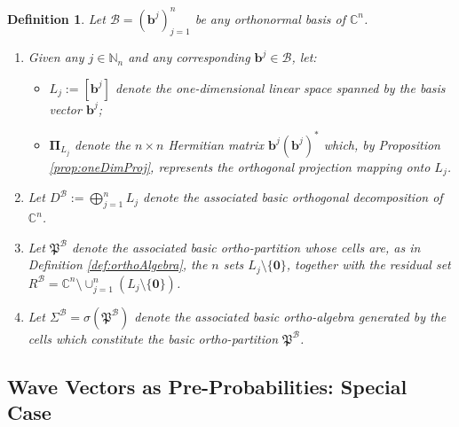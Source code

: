 \documentclass[11pt]{article}
\newcommand \N { \mathbb{N} }
\newcommand \C { \mathbb{C} }
\newtheorem{definition}[theorem]{Definition}
\begin{document}
\begin{definition}
	Let $ \mathcal B = ( \mathbf b^j )_{j = 1}^n $ be any orthonormal basis of $ \C^n $.
\begin{enumerate}	
	\item Given any $j \in \N_n $ and any corresponding $ \mathbf b^j \in \mathcal B$, let:
\begin{itemize}
	\item $ L_j := [ \mathbf b^j ]$ denote the one-dimensional linear space
	spanned by the basis vector $ \mathbf b^j $;
	\item $ \boldsymbol \Pi _{ L_j }$ denote 
	the $n \times n$ Hermitian matrix $ \mathbf b^j ( \mathbf b^j )^* $ which, 
	by Proposition \ref{prop:oneDimProj}, 
	represents the orthogonal projection mapping onto $ L_j $.   
\end{itemize}
	\item Let $ D^{ \mathcal B} := \bigoplus _{j = 1}^n L_j $
	denote the associated \emph{basic} orthogonal decomposition of $ \C^n $.
	\item Let $ \mathfrak P^{ \mathcal B} $ denote the associated \emph{basic} ortho-partition
	whose cells are, as in Definition \ref{def:orthoAlgebra}, 
	the $n$ sets $ L_j \setminus \{ \mathbf 0 \}$, together with the residual set 
 \( R^{ \mathcal B} = \C^n \setminus \cup _{j = 1}^n ( L_j \setminus \{ \mathbf 0 \}) \).
	\item Let $ \Sigma ^{ \mathcal B} = \sigma ( \mathfrak P^{ \mathcal B} )$ 
	denote the associated \emph{basic} ortho-algebra generated by the cells 
	which constitute the basic ortho-partition $ \mathfrak P^{ \mathcal B} $.
\end{enumerate}
\end{definition}

\subsection{Wave Vectors as Pre-Probabilities: Special Case}
\end{document}
